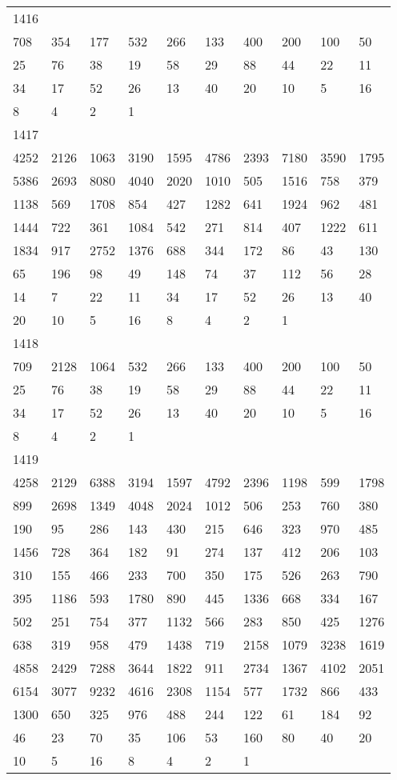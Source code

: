 \begin{longtable}{*{10}{l}}
1416&&&&&&&&&\\
708& 354& 177& 532& 266& 133& 400& 200& 100& 50\\
25& 76& 38& 19& 58& 29& 88& 44& 22& 11\\
34& 17& 52& 26& 13& 40& 20& 10& 5& 16\\
8& 4& 2& 1& \\

1417&&&&&&&&&\\
4252& 2126& 1063& 3190& 1595& 4786& 2393& 7180& 3590& 1795\\
5386& 2693& 8080& 4040& 2020& 1010& 505& 1516& 758& 379\\
1138& 569& 1708& 854& 427& 1282& 641& 1924& 962& 481\\
1444& 722& 361& 1084& 542& 271& 814& 407& 1222& 611\\
1834& 917& 2752& 1376& 688& 344& 172& 86& 43& 130\\
65& 196& 98& 49& 148& 74& 37& 112& 56& 28\\
14& 7& 22& 11& 34& 17& 52& 26& 13& 40\\
20& 10& 5& 16& 8& 4& 2& 1& \\

1418&&&&&&&&&\\
709& 2128& 1064& 532& 266& 133& 400& 200& 100& 50\\
25& 76& 38& 19& 58& 29& 88& 44& 22& 11\\
34& 17& 52& 26& 13& 40& 20& 10& 5& 16\\
8& 4& 2& 1& \\

1419&&&&&&&&&\\
4258& 2129& 6388& 3194& 1597& 4792& 2396& 1198& 599& 1798\\
899& 2698& 1349& 4048& 2024& 1012& 506& 253& 760& 380\\
190& 95& 286& 143& 430& 215& 646& 323& 970& 485\\
1456& 728& 364& 182& 91& 274& 137& 412& 206& 103\\
310& 155& 466& 233& 700& 350& 175& 526& 263& 790\\
395& 1186& 593& 1780& 890& 445& 1336& 668& 334& 167\\
502& 251& 754& 377& 1132& 566& 283& 850& 425& 1276\\
638& 319& 958& 479& 1438& 719& 2158& 1079& 3238& 1619\\
4858& 2429& 7288& 3644& 1822& 911& 2734& 1367& 4102& 2051\\
6154& 3077& 9232& 4616& 2308& 1154& 577& 1732& 866& 433\\
1300& 650& 325& 976& 488& 244& 122& 61& 184& 92\\
46& 23& 70& 35& 106& 53& 160& 80& 40& 20\\
10& 5& 16& 8& 4& 2& 1& \\


\end{longtable}

